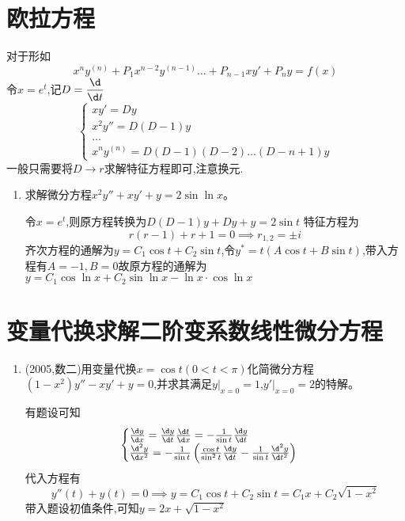 \documentclass[12pt, a4paper, oneside, UTF8]{ctexbook}
\begin{document}
\section{ 欧拉方程}
\begin{remark}
    对于形如
    $$
    x^ny^{(n)}+P_1x^{n-2}y^{(n-1)}\ldots+P_{n-1}xy'+P_ny=f(x)
    $$
    {\color{red} 令$x=e^t$},记$\displaystyle D=\frac{\d}{\d t}$
    $$
    \begin{cases}
        xy' = Dy \\
        x^2y'' = D(D-1)y \\
        \ldots \\
        x^ny^{(n)} = D(D-1)(D-2)\ldots(D-n+1)y
    \end{cases}
    $$
    一般只需要将$D\rightarrow r$求解特征方程即可,注意换元.
\end{remark}
\begin{enumerate}[label=\arabic*.,start=14]
    \item 求解微分方程$x^2y''+xy'+y=2\sin\ln x$。
    
    \begin{solution}
    {\color{red} 令$x=e^t$},则原方程转换为$D(D-1)y+Dy+y=2\sin{t}$ 特征方程为
    $$
    r(r-1)+r+1=0 \implies r_{1,2}=\pm i
    $$
    齐次方程的通解为$y=C_1\cos{t}+C_2\sin{t}$,令$y^{*}=t(A\cos{t}+B\sin{t})$,带入方程有$A=-1,B=0$故原方程的通解为
    $y=C_1\cos{\ln{x}}+C_2\sin{\ln{x}}-\ln{x}\cdot\cos{\ln{x}}$
    \end{solution}
\end{enumerate}

\section{ 变量代换求解二阶变系数线性微分方程}

\begin{enumerate}[label=\arabic*.,start=17]
    \item (2005,数二)用变量代换$x=\cos t(0<t<\pi)$化简微分方程$(1-x^2)y''-xy'+y=0$,并求其满足$y|_{x=0}=1$,$y'|_{x=0}=2$的特解。
    
    \begin{solution}
    有题设可知
    $$
    \begin{cases}
        \frac{\d y}{\d x}=\frac{\d y}{\d t}\frac{\d t}{\d x}=-\frac{1}{\sin{t}}\frac{\d y}{\d t} \\
        \frac{\d^2 y}{\d x^2} = -\frac{1}{\sin{t}}\left(\frac{\cos{t}}{\sin^2{t}}\frac{\d y}{\d t}-\frac{1}{\sin{t}}\frac{\d^2 y}{\d t^2}\right)
    \end{cases}
    $$
    代入方程有
    $$
    y''(t)+y(t) = 0 \implies y = C_1\cos{t}+C_2\sin{t} = C_1x+C_2\sqrt{1-x^2}
    $$
    带入题设初值条件,可知$y=2x+\sqrt{1-x^2}$
    \end{solution}
\end{enumerate}
\end{document}

